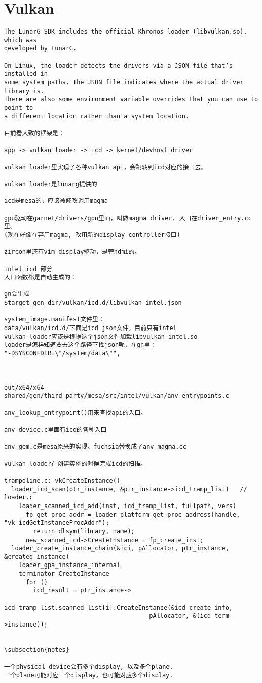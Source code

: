 \section{Vulkan}
\begin{verbatim}
The LunarG SDK includes the official Khronos loader (libvulkan.so), which was
developed by LunarG.

On Linux, the loader detects the drivers via a JSON file that’s installed in
some system paths. The JSON file indicates where the actual driver library is.
There are also some environment variable overrides that you can use to point to
a different location rather than a system location.

目前看大致的框架是：

app -> vulkan loader -> icd -> kernel/devhost driver

vulkan loader里实现了各种vulkan api，会跳转到icd对应的接口去。

vulkan loader是lunarg提供的

icd是mesa的，应该被修改调用magma

gpu驱动在garnet/drivers/gpu里面，叫做magma driver. 入口在driver_entry.cc里。
(现在好像在弃用magma, 改用新的display controller接口)

zircon里还有vim display驱动，是管hdmi的。

intel icd 部分
入口函数都是自动生成的：

gn会生成
$target_gen_dir/vulkan/icd.d/libvulkan_intel.json

system_image.manifest文件里：
data/vulkan/icd.d/下面是icd json文件。目前只有intel
vulkan loader应该是根据这个json文件加载libvulkan_intel.so
loader是怎样知道要去这个路径下找json呢，在gn里：
"-DSYSCONFDIR=\"/system/data\"",



out/x64/x64-shared/gen/third_party/mesa/src/intel/vulkan/anv_entrypoints.c

anv_lookup_entrypoint()用来查找api的入口。

anv_device.c里面有icd的各种入口

anv_gem.c是mesa原来的实现。fuchsia替换成了anv_magma.cc

vulkan loader在创建实例的时候完成icd的扫描。

trampoline.c: vkCreateInstance()
  loader_icd_scan(ptr_instance, &ptr_instance->icd_tramp_list)   // loader.c
    loader_scanned_icd_add(inst, icd_tramp_list, fullpath, vers)
      fp_get_proc_addr = loader_platform_get_proc_address(handle, "vk_icdGetInstanceProcAddr");
        return dlsym(library, name);
      new_scanned_icd->CreateInstance = fp_create_inst;
  loader_create_instance_chain(&ici, pAllocator, ptr_instance, &created_instance)
    loader_gpa_instance_internal
    terminator_CreateInstance
      for ()
        icd_result = ptr_instance->
            icd_tramp_list.scanned_list[i].CreateInstance(&icd_create_info, 
                                        pAllocator, &(icd_term->instance));


\subsection{notes}

一个physical device会有多个display, 以及多个plane.
一个plane可能对应一个display，也可能对应多个display.


\end{verbatim}
